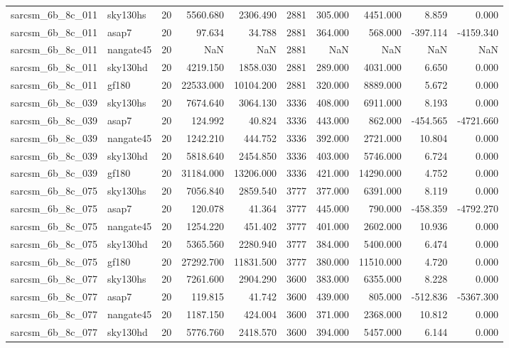 \begin{longtable}{llrrrrrrrr}
sarcsm\_6b\_8c\_011 & sky130hs & 20 & 5560.680 & 2306.490 & 2881 & 305.000 & 4451.000 & 8.859 & 0.000 \\
sarcsm\_6b\_8c\_011 & asap7 & 20 & 97.634 & 34.788 & 2881 & 364.000 & 568.000 & -397.114 & -4159.340 \\
sarcsm\_6b\_8c\_011 & nangate45 & 20 & NaN & NaN & 2881 & NaN & NaN & NaN & NaN \\
sarcsm\_6b\_8c\_011 & sky130hd & 20 & 4219.150 & 1858.030 & 2881 & 289.000 & 4031.000 & 6.650 & 0.000 \\
sarcsm\_6b\_8c\_011 & gf180 & 20 & 22533.000 & 10104.200 & 2881 & 320.000 & 8889.000 & 5.672 & 0.000 \\
sarcsm\_6b\_8c\_039 & sky130hs & 20 & 7674.640 & 3064.130 & 3336 & 408.000 & 6911.000 & 8.193 & 0.000 \\
sarcsm\_6b\_8c\_039 & asap7 & 20 & 124.992 & 40.824 & 3336 & 443.000 & 862.000 & -454.565 & -4721.660 \\
sarcsm\_6b\_8c\_039 & nangate45 & 20 & 1242.210 & 444.752 & 3336 & 392.000 & 2721.000 & 10.804 & 0.000 \\
sarcsm\_6b\_8c\_039 & sky130hd & 20 & 5818.640 & 2454.850 & 3336 & 403.000 & 5746.000 & 6.724 & 0.000 \\
sarcsm\_6b\_8c\_039 & gf180 & 20 & 31184.000 & 13206.000 & 3336 & 421.000 & 14290.000 & 4.752 & 0.000 \\
sarcsm\_6b\_8c\_075 & sky130hs & 20 & 7056.840 & 2859.540 & 3777 & 377.000 & 6391.000 & 8.119 & 0.000 \\
sarcsm\_6b\_8c\_075 & asap7 & 20 & 120.078 & 41.364 & 3777 & 445.000 & 790.000 & -458.359 & -4792.270 \\
sarcsm\_6b\_8c\_075 & nangate45 & 20 & 1254.220 & 451.402 & 3777 & 401.000 & 2602.000 & 10.936 & 0.000 \\
sarcsm\_6b\_8c\_075 & sky130hd & 20 & 5365.560 & 2280.940 & 3777 & 384.000 & 5400.000 & 6.474 & 0.000 \\
sarcsm\_6b\_8c\_075 & gf180 & 20 & 27292.700 & 11831.500 & 3777 & 380.000 & 11510.000 & 4.720 & 0.000 \\
sarcsm\_6b\_8c\_077 & sky130hs & 20 & 7261.600 & 2904.290 & 3600 & 383.000 & 6355.000 & 8.228 & 0.000 \\
sarcsm\_6b\_8c\_077 & asap7 & 20 & 119.815 & 41.742 & 3600 & 439.000 & 805.000 & -512.836 & -5367.300 \\
sarcsm\_6b\_8c\_077 & nangate45 & 20 & 1187.150 & 424.004 & 3600 & 371.000 & 2368.000 & 10.812 & 0.000 \\
sarcsm\_6b\_8c\_077 & sky130hd & 20 & 5776.760 & 2418.570 & 3600 & 394.000 & 5457.000 & 6.144 & 0.000 \\

\end{longtable}
